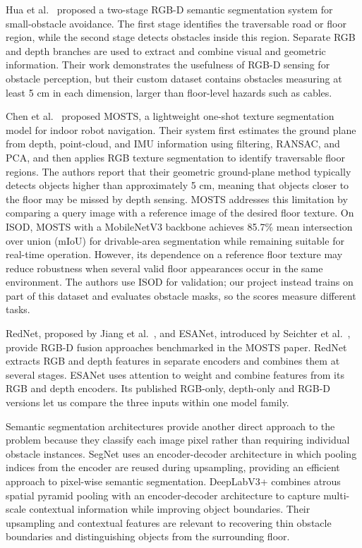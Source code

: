 \documentclass[conference]{IEEEtran}
\begin{document}
Hua et al.~\cite{hua2019small} proposed a two-stage RGB-D semantic
segmentation system for small-obstacle avoidance. The first stage
identifies the traversable road or floor region, while the second stage
detects obstacles inside this region. Separate RGB and depth branches
are used to extract and combine visual and geometric information. Their
work demonstrates the usefulness of RGB-D sensing for obstacle
perception, but their custom dataset contains obstacles measuring at
least 5 cm in each dimension, larger than floor-level hazards such as
cables.

Chen et al.~\cite{chen2023self} proposed MOSTS, a lightweight one-shot
texture segmentation model for indoor robot navigation. Their system
first estimates the ground plane from depth, point-cloud, and IMU
information using filtering, RANSAC, and PCA, and then applies RGB
texture segmentation to identify traversable floor regions. The authors
report that their geometric ground-plane method typically detects
objects higher than approximately 5 cm, meaning that objects closer to
the floor may be missed by depth sensing. MOSTS addresses this
limitation by comparing a query image with a reference image of the
desired floor texture. On ISOD, MOSTS with a MobileNetV3 backbone
achieves 85.7\% mean intersection over union (mIoU) for drivable-area
segmentation while remaining suitable for real-time operation. However,
its dependence on a reference floor texture may reduce robustness when
several valid floor appearances occur in the same environment. The
authors use ISOD for validation; our project instead trains on part of
this dataset and evaluates obstacle masks, so the scores measure
different tasks.

RedNet, proposed by Jiang et al.~\cite{jiang2018rednet}, and ESANet,
introduced by Seichter et al.~\cite{seichter2021efficient}, provide
RGB-D fusion approaches benchmarked in the MOSTS paper. RedNet extracts
RGB and depth features in separate encoders and combines them at several
stages. ESANet uses attention to weight and combine features from its
RGB and depth encoders. Its published RGB-only, depth-only and RGB-D
versions let us compare the three inputs within one model family.

Semantic segmentation architectures provide another direct approach to
the problem because they classify each image pixel rather than requiring
individual obstacle instances. SegNet \cite{badrinarayanan2017segnet}
uses an encoder-decoder architecture in which pooling indices from the
encoder are reused during upsampling, providing an efficient approach to
pixel-wise semantic segmentation. DeepLabV3+ \cite{chen2018encoder}
combines atrous spatial pyramid pooling with an encoder-decoder
architecture to capture multi-scale contextual information while
improving object boundaries. Their upsampling and contextual features
are relevant to recovering thin obstacle boundaries and distinguishing
objects from the surrounding floor.
\end{document}
